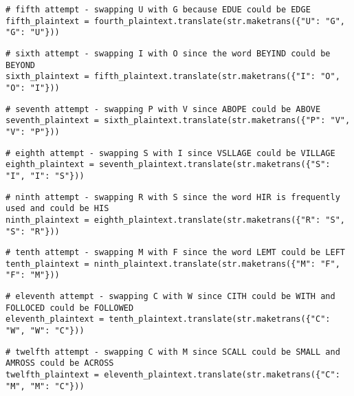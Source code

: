 \documentclass[12pt,a4paper]{article}
\begin{document}
\begin{lstlisting}[caption=EDGE Pattern Recognition]
# fifth attempt - swapping U with G because EDUE could be EDGE
fifth_plaintext = fourth_plaintext.translate(str.maketrans({"U": "G", "G": "U"}))
\end{lstlisting}

\begin{lstlisting}[caption=BEYOND Pattern Recognition]
# sixth attempt - swapping I with O since the word BEYIND could be BEYOND
sixth_plaintext = fifth_plaintext.translate(str.maketrans({"I": "O", "O": "I"}))
\end{lstlisting}

\begin{lstlisting}[caption=ABOVE Pattern Recognition]
# seventh attempt - swapping P with V since ABOPE could be ABOVE
seventh_plaintext = sixth_plaintext.translate(str.maketrans({"P": "V", "V": "P"}))
\end{lstlisting}

\begin{lstlisting}[caption=VILLAGE Pattern Recognition]
# eighth attempt - swapping S with I since VSLLAGE could be VILLAGE
eighth_plaintext = seventh_plaintext.translate(str.maketrans({"S": "I", "I": "S"}))
\end{lstlisting}

\begin{lstlisting}[caption=HIS Pattern Recognition]
# ninth attempt - swapping R with S since the word HIR is frequently used and could be HIS
ninth_plaintext = eighth_plaintext.translate(str.maketrans({"R": "S", "S": "R"}))
\end{lstlisting}

\begin{lstlisting}[caption=LEFT Pattern Recognition]
# tenth attempt - swapping M with F since the word LEMT could be LEFT
tenth_plaintext = ninth_plaintext.translate(str.maketrans({"M": "F", "F": "M"}))
\end{lstlisting}

\begin{lstlisting}[caption=WITH Pattern Recognition]
# eleventh attempt - swapping C with W since CITH could be WITH and FOLLOCED could be FOLLOWED
eleventh_plaintext = tenth_plaintext.translate(str.maketrans({"C": "W", "W": "C"}))
\end{lstlisting}

\begin{lstlisting}[caption=SMALL and ACROSS Pattern Recognition]
# twelfth attempt - swapping C with M since SCALL could be SMALL and AMROSS could be ACROSS
twelfth_plaintext = eleventh_plaintext.translate(str.maketrans({"C": "M", "M": "C"}))
\end{lstlisting}
\end{document}
